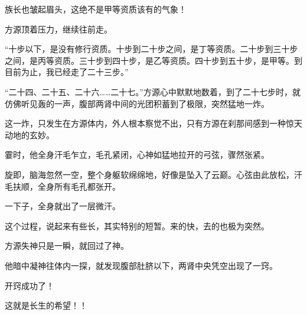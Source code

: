 \begin{this_body}
族长也皱起眉头，这绝不是甲等资质该有的气象！

方源顶着压力，继续往前走。

“十步以下，是没有修行资质。十步到二十步之间，是丁等资质。二十步到三十步之间，是丙等资质。三十步到四十步，是乙等资质。四十步到五十步，是甲等。到目前为止，我已经走了二十三步。”

“二十四、二十五、二十六……二十七。”方源心中默默地数着，到了二十七步时，就仿佛听见轰的一声，腹部两肾中间的光团积蓄到了极限，突然猛地一炸。

这一炸，只发生在方源体内，外人根本察觉不出，只有方源在刹那间感到一种惊天动地的玄妙。

霎时，他全身汗毛乍立，毛孔紧闭，心神如猛地拉开的弓弦，骤然张紧。

旋即，脑海忽然一空，整个身躯软绵绵地，好像是坠入了云巅。心弦由此放松，汗毛扶顺，全身所有毛孔都张开。

一下子，全身就出了一层微汗。

这个过程，说起来有些长，其实特别的短暂。来的快，去的也极为突然。

方源失神只是一瞬，就回过了神。

他暗中凝神往体内一探，就发现腹部肚脐以下，两肾中央凭空出现了一窍。

开窍成功了！

这就是长生的希望！！

\end{this_body}

